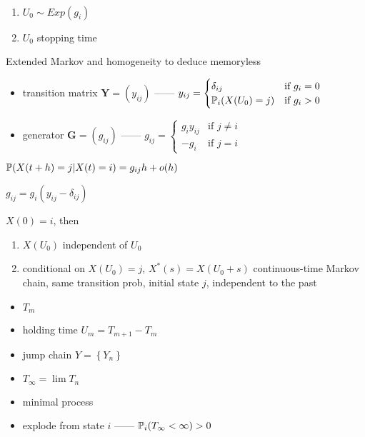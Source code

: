 \begin{thm}\,
    \begin{enumerate}
        \item $U_0 \sim Exp(g_i)$
        \item $U_0$ stopping time
    \end{enumerate}
\end{thm}
\begin{pf}
    Extended Markov and homogeneity to deduce memoryless
\end{pf}

\begin{itemize}
    \item transition matrix $\textbf{Y} = (y_{ij})$ ------ $y_{ij} = \begin{cases}
                                                                \delta_{ij} & \text{if } g_i = 0\\
                                                                \mathbb{P}_i(X(U_0) = j) & \text{if } g_i > 0
    \end{cases}$
    \item generator $\textbf{G} = (g_{ij})$ ------ $g_{ij} = \begin{cases}
                                                        g_{i} y_{ij} &\text{if } j \neq i\\
                                                        -g_i & \text{if } j = i
    \end{cases}$
\end{itemize}

\begin{fact}
    $\mathbb{P}(X(t+h) = j |X(t) = i) = g_{ij}h + o(h)$
\end{fact}

\begin{fact}
    $g_{ij} = g_i(y_{ij} - \delta_{ij})$
\end{fact}

\begin{thm}
    $X(0) = i$, then
    \begin{enumerate}
        \item $X(U_0)$ independent of $U_0$
        \item conditional on $X(U_0) = j$, $X^*(s) = X(U_0 + s)$ continuous-time Markov chain, same transition prob, initial state $j$, independent to the past
    \end{enumerate}
\end{thm}

\begin{itemize}
    \item $T_m$
    \item holding time $U_m = T_{m + 1} - T_m$
    \item jump chain $Y = \left\{ Y_n \right\}$
    \item $T_{\infty} = \lim T_n$
    \item minimal process
    \item explode from state $i$ ------ $\mathbb{P}_i(T_\infty < \infty) > 0$
\end{itemize}

